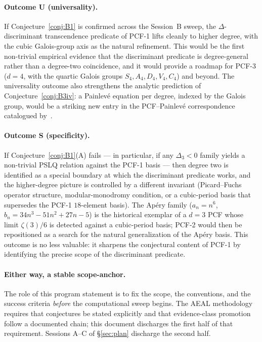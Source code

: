\documentclass[11pt,a4paper]{article}
\theoremstyle{definition}
\theoremstyle{remark}
\begin{document}
\paragraph{Outcome U (universality).}
If Conjecture~\ref{conj:B1} is confirmed across the Session~B sweep,
the $\Delta$-discriminant transcendence predicate of PCF-1 lifts cleanly
to higher degree, with the cubic Galois-group axis as the natural
refinement. This would be the first non-trivial empirical evidence that
the discriminant predicate is degree-general rather than a degree-two
coincidence, and it would provide a roadmap for PCF-3 ($d=4$, with the
quartic Galois groups $S_{4}, A_{4}, D_{4}, V_{4}, C_{4}$) and beyond.
The universality outcome also strengthens the analytic prediction of
Conjecture~\ref{conj:B3iv}: a Painlev\'e equation per degree, indexed by
the Galois group, would be a striking new entry in the
PCF--Painlev\'e correspondence catalogued by~\cite{Mazzocco2003}.

\paragraph{Outcome S (specificity).}
If Conjecture~\ref{conj:B1}(A) fails --- in particular, if any
$\Delta_{3}<0$ family yields a non-trivial PSLQ relation against the
PCF-1 basis --- then degree two is identified as a special boundary at
which the discriminant predicate works, and the higher-degree picture is
controlled by a different invariant (Picard--Fuchs operator structure,
modular-monodromy condition, or a cubic-period basis that supersedes
the PCF-1 $18$-element basis). The Ap\'ery family
($a_{n}=n^{6}$, $b_{n}=34n^{3}-51n^{2}+27n-5$) is the historical exemplar
of a $d=3$ PCF whose limit $\zeta(3)/6$ is detected against a cubic-period
basis; PCF-2 would then be repositioned as a search for the natural
generalization of the Ap\'ery basis. This outcome is no less valuable: it
sharpens the conjectural content of PCF-1 by identifying the precise
scope of the discriminant predicate.

\paragraph{Either way, a stable scope-anchor.}
The role of this program statement is to fix the scope, the conventions,
and the success criteria \emph{before} the computational sweep begins.
The AEAL methodology requires that conjectures be stated explicitly and
that evidence-class promotion follow a documented chain; this document
discharges the first half of that requirement. Sessions A--C of
\S\ref{sec:plan} discharge the second half.
\end{document}
